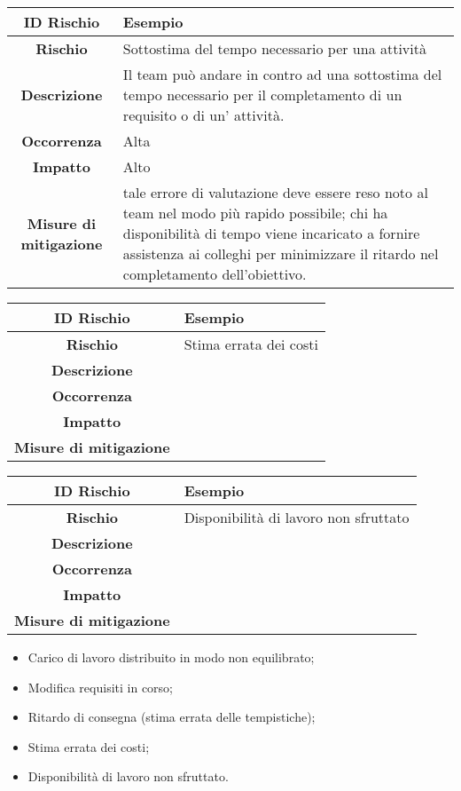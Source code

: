 \documentclass[10pt, a4paper]{article}
\begin{document}
{{{{\renewcommand{\arraystretch}{1.5}
\begin{tabularx}{\textwidth}{c|X}
\textbf{ID Rischio} & Esempio \\
\hline
\textbf{Rischio} & Sottostima del tempo necessario per una attività\\
\hline
\textbf{Descrizione} & Il team può andare in contro ad una sottostima del tempo necessario per il completamento di un requisito o di un' attività.\\
\hline
\textbf{Occorrenza} & Alta\\
\hline
\textbf{Impatto} & Alto\\
\hline
\textbf{Misure di mitigazione} & tale errore di valutazione deve essere reso noto al team nel modo più rapido possibile; chi ha disponibilità di tempo viene incaricato a fornire assistenza ai colleghi per minimizzare il ritardo nel completamento dell'obiettivo.\\

\end{tabularx}}

{\renewcommand{\arraystretch}{1.5}
\begin{tabularx}{\textwidth}{c|X}
\textbf{ID Rischio} & Esempio \\
\hline
\textbf{Rischio} & Stima errata dei costi \\
\hline
\textbf{Descrizione} & \\
\hline
\textbf{Occorrenza} & \\
\hline
\textbf{Impatto} & \\
\hline
\textbf{Misure di mitigazione} & \\
\end{tabularx}

{\renewcommand{\arraystretch}{1.5}
\begin{tabularx}{\textwidth}{c|X}
\textbf{ID Rischio} & Esempio \\
\hline
\textbf{Rischio} & Disponibilità di lavoro non sfruttato \\
\hline
\textbf{Descrizione} & \\
\hline
\textbf{Occorrenza} & \\
\hline
\textbf{Impatto} & \\
\hline
\textbf{Misure di mitigazione} & \\
\end{tabularx}


\begin{itemize}
    \item Carico di lavoro distribuito in modo non equilibrato;
    \item Modifica requisiti in corso;
    \item Ritardo di consegna (stima errata delle tempistiche);
    \item Stima errata dei costi;
    \item Disponibilità di lavoro non sfruttato.
\end{itemize}

}}}}}
\end{document}
